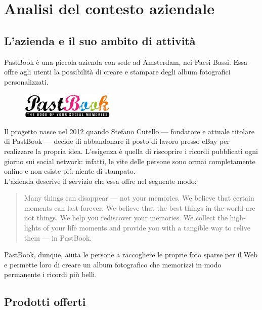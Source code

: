 \chapter{Analisi del contesto aziendale}
	\section{L'azienda e il suo ambito di attività}
		PastBook è una piccola azienda con sede ad Amsterdam, nei Paesi Bassi. Essa offre agli utenti la possibilità di creare e stampare
		degli album fotografici personalizzati.
		\begin{figure}[H]
			\centering
			\includegraphics[width=0.4\textwidth]{capitolo_1/immagini/logo_pastbook.png}
		\end{figure}
		Il progetto nasce nel 2012 quando Stefano Cutello — fondatore e attuale titolare di PastBook — decide di abbandonare il posto di
		lavoro presso eBay per realizzare la propria idea. L'esigenza è quella di riscoprire i ricordi pubblicati ogni giorno sui social
		network: infatti, le vite delle persone sono ormai completamente online e non esiste più niente di stampato.\\
		L'azienda descrive il servizio che essa offre nel seguente modo:
		\hyphenblockquote{english}{Many things can disappear — not your memories. We believe that certain moments can last forever. We
			believe that the best things in the world are not things. We help you rediscover your memories. We collect the highlights of
			your life moments and provide you with a tangible way to relive them — in PastBook.}
		PastBook, dunque, aiuta le persone a raccogliere le proprie foto sparse per il Web e permette loro di creare un album fotografico
		che memorizzi in modo permanente i ricordi più belli.
	\section{Prodotti offerti}
